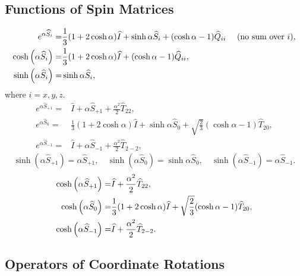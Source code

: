\subsection{Functions of Spin Matrices}
\begin{align}
e^{\alpha \widehat{S}_{i}}=&\frac{1}{3}(1+2 \cosh \alpha) \widehat{I}+  \sinh \alpha \widehat{S}_{i}+(\cosh \alpha-1) \widehat{Q}_{i i} \quad \text { (no sum over $ i$)} , \label{eq:2:6:67}\\
\cosh \left(\alpha \widehat{S}_{i}\right)= & \frac{1}{3}(1+2 \cosh \alpha) \widehat{I}+(\cosh \alpha-1) \widehat{Q}_{i i} , \label{eq:2:6:68}\\
\sinh \left(\alpha \widehat{S}_{i}\right)=&\sinh \alpha \widehat{S}_{i} ,\label{eq:2:6:69}
\end{align}
where $i=x, y, z$.
\begin{align}
e^{\alpha \widehat{S}_{+1}}=&\widehat{I}+\alpha \widehat{S}_{+1}+\frac{\alpha^{2}}{2} \widehat{T}_{22} , \label{eq:2:6:70}\\
e^{\alpha \widehat{S}_{0}}=&\frac{1}{3}(1+2 \cosh \alpha) \widehat{I}+\sinh \alpha \widehat{S}_{0}+\sqrt{\frac{2}{3}}(\cosh \alpha-1) \widehat{T}_{20} , \label{eq:2:6:71}\\
e^{\alpha \widehat{S}_{-1}}=&\widehat{I}+\alpha \widehat{S}_{-1}+\frac{\alpha^{2}}{2} \widehat{T}_{2-2} , \label{eq:2:6:72}
\end{align}
\begin{equation}
\sinh \left(\alpha \widehat{S}_{+1}\right)=\alpha \widehat{S}_{+1}, \quad \sinh \left(\alpha \widehat{S}_{0}\right)=\sinh \alpha \widehat{S}_{0}, \quad \sinh \left(\alpha \widehat{S}_{-1}\right)=\alpha \widehat{S}_{-1} .\label{eq:2:6:73}
\end{equation}
\begin{align}
\cosh \left(\alpha \widehat{S}_{+1}\right)=&\widehat{I}+\frac{\alpha^{2}}{2} \widehat{T}_{22} , \notag\\
\cosh \left(\alpha \widehat{S}_{0}\right)=&\frac{1}{3}(1+2 \cosh \alpha) \widehat{I}+\sqrt{\frac{2}{3}}(\cosh \alpha-1) \widehat{T}_{20} , \label{eq:2:6:74}\\
\cosh \left(\alpha \widehat{S}_{-1}\right)=&\widehat{I}+\frac{\alpha^{2}}{2} \widehat{T}_{2-2}. \notag
\end{align}
\subsection{Operators of Coordinate Rotations}
